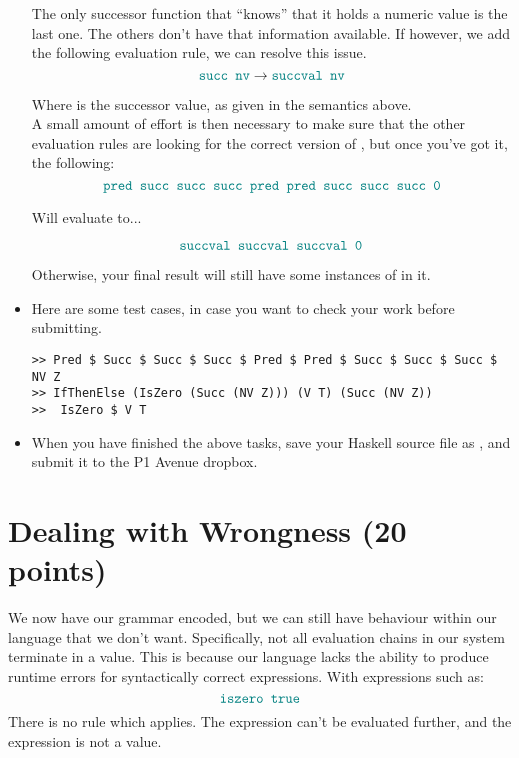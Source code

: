 \documentclass{exam}
\let\OldTexttt\texttt
\renewcommand{\texttt}[1]{\OldTexttt{\color{teal}{#1}}}
\begin{document}
\begin{itemize}
The only successor function that ``knows'' that it holds a numeric value is the last one. The others don't have that information available. If however, we add the following evaluation rule, we can resolve this issue.  \\

\begin{equation}
\texttt{succ nv} \rightarrow \texttt{succval nv}
\end{equation}

Where \texttt{succval} is the successor value, as given in the semantics above.  \\

A small amount of effort is then necessary to make sure that the other evaluation rules are looking for the correct version of \texttt{succ}, but once you've got it, the following: \\

\begin{equation}
\texttt{pred succ succ succ pred pred succ succ succ 0}
\end{equation}

Will evaluate to...

\begin{equation}
\texttt{succval succval succval 0}
\end{equation}

Otherwise, your final result will still have some instances of \texttt{pred} in it.  

\item Here are some test cases, in case you want to check your work before submitting.
\begin{lstlisting}[style=C]
>> Pred $ Succ $ Succ $ Succ $ Pred $ Pred $ Succ $ Succ $ Succ $ NV Z
>> IfThenElse (IsZero (Succ (NV Z))) (V T) (Succ (NV Z))
>>  IsZero $ V T
\end{lstlisting}

\item When you have finished the above tasks, save your Haskell source file as \texttt{UAE-1.hs}, and submit it to the P1 Avenue dropbox. 
\end{itemize}


\section{Dealing with Wrongness (20 points)}
We now have our grammar encoded, but we can still have behaviour within our language that we don't want.  Specifically, not all evaluation chains in our system terminate in a value.  This is because our language lacks the ability to produce runtime errors for syntactically correct expressions. With expressions such as:
\begin{equation}
\texttt{iszero true}
\end{equation}
There is no rule which applies.  The expression can't be evaluated further, and the expression is not a value.  \\
\end{document}
